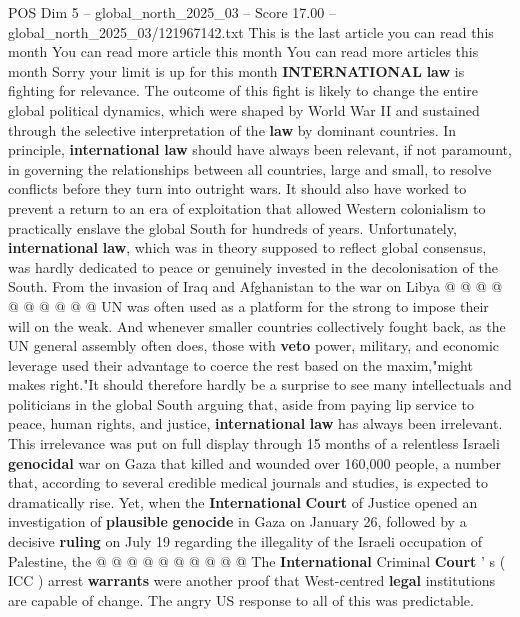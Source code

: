 \begin{textsample}{POS Dim 5 – global\_north\_2025\_03 – Score 17.00 – global\_north\_2025\_03/121967142.txt}  \label{ex:f5_pos_202}
This is the last article you can read this month You can read more article this month You can read more articles this month Sorry your limit is up for this month \textbf{INTERNATIONAL} \textbf{law} is fighting for relevance.
The outcome of this fight is likely to change the entire global political dynamics, which were shaped by World War II and sustained through the selective interpretation of the \textbf{law} by dominant countries.
In principle, \textbf{international} \textbf{law} should have always been relevant, if not paramount, in governing the relationships between all countries, large and small, to resolve conflicts before they turn into outright wars.
It should also have worked to prevent a return to an era of exploitation that allowed Western colonialism to practically enslave the global South for hundreds of years.
Unfortunately, \textbf{international} \textbf{law}, which was in theory supposed to reflect global consensus, was hardly dedicated to peace or genuinely invested in the decolonisation of the South.
From the invasion of Iraq and Afghanistan to the war on Libya @ @ @ @ @ @ @ @ @ @ UN was often used as a platform for the strong to impose their will on the weak.
And whenever smaller countries collectively fought back, as the UN general assembly often does, those with \textbf{veto} power, military, and economic leverage used their advantage to coerce the rest based on the maxim,"might makes right."It should therefore hardly be a surprise to see many intellectuals and politicians in the global South arguing that, aside from paying lip service to peace, human rights, and justice, \textbf{international} \textbf{law} has always been irrelevant.
This irrelevance was put on full display through 15 months of a relentless Israeli \textbf{genocidal} war on Gaza that killed and wounded over 160,000 people, a number that, according to several credible medical journals and studies, is expected to dramatically rise.
Yet, when the \textbf{International} \textbf{Court} of Justice opened an investigation of \textbf{plausible} \textbf{genocide} in Gaza on January 26, followed by a decisive \textbf{ruling} on July 19 regarding the illegality of the Israeli occupation of Palestine, the @ @ @ @ @ @ @ @ @ @ The \textbf{International} Criminal \textbf{Court} ' s ( ICC ) arrest \textbf{warrants} were another proof that West-centred \textbf{legal} institutions are capable of change.
The angry US response to all of this was predictable.

\end{textsample}
